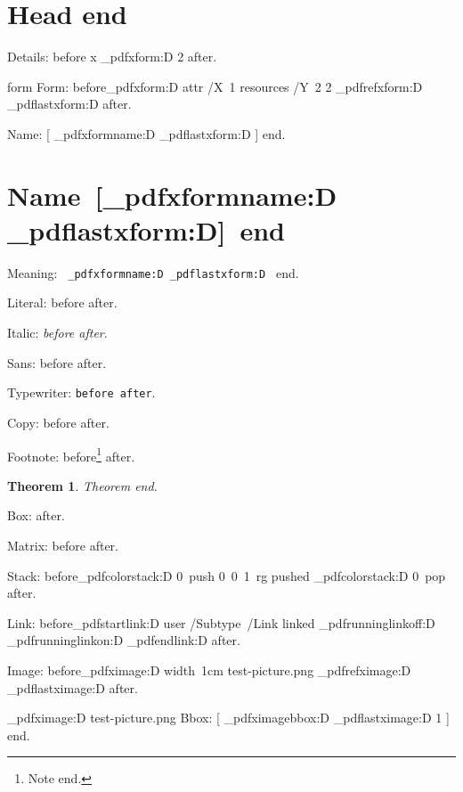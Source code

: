 \documentclass{article}
\newtheorem{theorem}{Theorem}
\begin{document}
\tableofcontents

\section{Head  end}

Details: before \ExplSyntaxOn {}\hbox{x} \tex_pdfxform:D 2 \ExplSyntaxOff after.

\hbox{form}%
Form: before\ExplSyntaxOn \tex_pdfxform:D attr {/X~1} resources {/Y~2} 2
\tex_pdfrefxform:D \tex_pdflastxform:D \ExplSyntaxOff{} after.

\ExplSyntaxOn
\edef \formedef { \tex_pdfxformname:D \tex_pdflastxform:D }
\ExplSyntaxOff
Name: [\formedef] end.

\ExplSyntaxOn
\section{Name~[\tex_pdfxformname:D \tex_pdflastxform:D]~end}
\ExplSyntaxOff

Meaning: \texttt{\meaning\formedef} end.

Literal: before  after.

Italic: \emph{before  after}.

Sans: \textsf{before  after}.

Typewriter: \texttt{before  after}.

Copy: before  after.

Footnote: before\footnote{Note  end.} after.

\begin{theorem}
Theorem  end.
\end{theorem}

Box:  after.

Matrix: before  after.

Stack: before\ExplSyntaxOn \tex_pdfcolorstack:D 0~push {0~0~1~rg} pushed
\tex_pdfcolorstack:D 0~pop \ExplSyntaxOff{} after.

Link: before\ExplSyntaxOn \tex_pdfstartlink:D user {/Subtype~/Link} linked
\tex_pdfrunninglinkoff:D \tex_pdfrunninglinkon:D \tex_pdfendlink:D \ExplSyntaxOff{} after.

Image: before\ExplSyntaxOn \tex_pdfximage:D width~1cm {test-picture.png}
\tex_pdfrefximage:D \tex_pdflastximage:D \ExplSyntaxOff{} after.

\ExplSyntaxOn
\tex_pdfximage:D {test-picture.png}
\edef \bboxedef { \tex_pdfximagebbox:D \tex_pdflastximage:D 1 }
\ExplSyntaxOff
Bbox: [\bboxedef] end.
\end{document}
